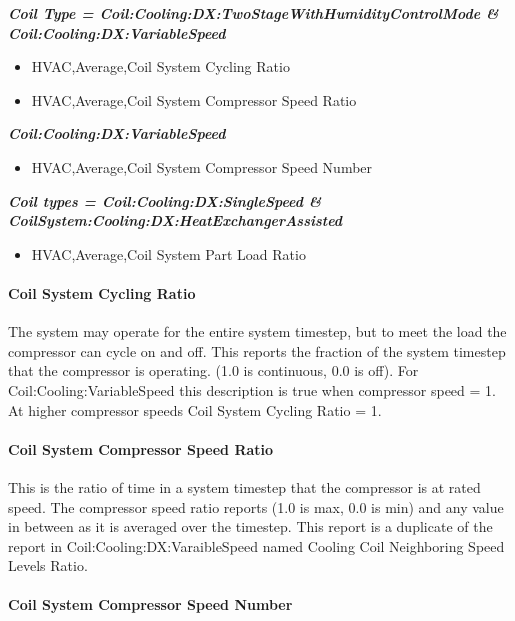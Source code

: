 \textbf{\emph{Coil Type = Coil:Cooling:DX:TwoStageWithHumidityControlMode \& Coil:Cooling:DX:VariableSpeed}}

\begin{itemize}
\item
  HVAC,Average,Coil System Cycling Ratio
\item
  HVAC,Average,Coil System Compressor Speed Ratio
\end{itemize}

\textbf{\emph{Coil:Cooling:DX:VariableSpeed}}

\begin{itemize}
\item
  HVAC,Average,Coil System Compressor Speed Number
\end{itemize}

\textbf{\emph{Coil types = Coil:Cooling:DX:SingleSpeed \& CoilSystem:Cooling:DX:HeatExchangerAssisted}}

\begin{itemize}
\tightlist
\item
  HVAC,Average,Coil System Part Load Ratio
\end{itemize}

\paragraph{Coil System Cycling Ratio}\label{coil-system-cycling-ratio}

The system may operate for the entire system timestep, but to meet the load the compressor can cycle on and off. This reports the fraction of the system timestep that the compressor is operating. (1.0 is continuous, 0.0 is off). For Coil:Cooling:VariableSpeed this description is true when compressor speed = 1. At higher compressor speeds Coil System Cycling Ratio = 1.

\paragraph{Coil System Compressor Speed Ratio}

This is the ratio of time in a system timestep that the compressor is at rated speed. The compressor speed ratio reports (1.0 is max, 0.0 is min) and any value in between as it is averaged over the timestep. This report is a duplicate of the report in Coil:Cooling:DX:VaraibleSpeed named Cooling Coil Neighboring Speed Levels Ratio.

\paragraph{Coil System Compressor Speed Number}\label{coil-system-compressor-speed-ratio}

